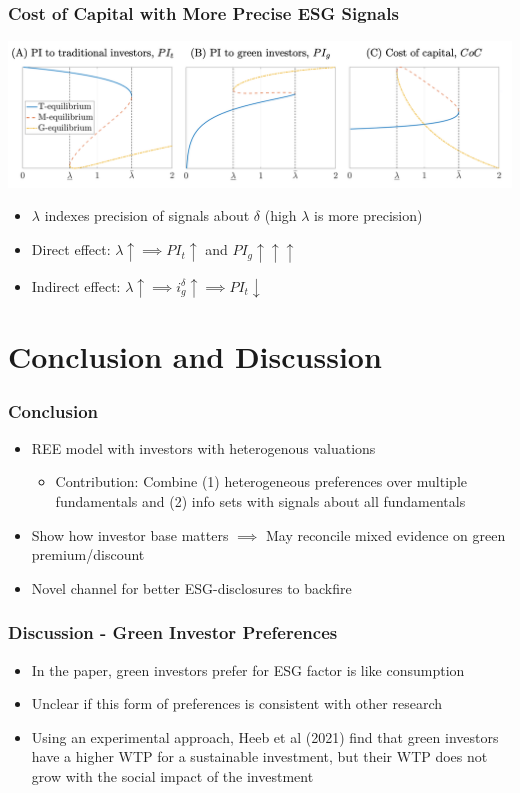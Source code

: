 \documentclass[handout]{beamer}
\begin{document}
\begin{frame}
\frametitle{Cost of Capital with More Precise ESG Signals}
\begin{center}
\includegraphics[scale=0.45]{information}
\end{center}
\begin{itemize}[<+->]
\item $\lambda$ indexes precision of signals about $\delta$ (high $\lambda$ is more precision)
\item Direct effect: $\lambda \uparrow \implies PI_t \uparrow$ and $PI_g \uparrow\uparrow\uparrow$
\item Indirect effect: $\lambda \uparrow \implies i_g^\delta \uparrow \implies PI_t \downarrow$
\end{itemize}
\end{frame}

\section{Conclusion and Discussion}

\begin{frame}
\frametitle{Conclusion}
\begin{itemize}[<+->]
\item REE model with investors with heterogenous valuations
\begin{itemize}[<+->]
\item Contribution: Combine (1) heterogeneous preferences over multiple fundamentals and (2) info sets with signals about all fundamentals
\end{itemize}
\bigskip
\item Show how investor base matters $\implies$ May reconcile mixed evidence on green premium/discount
\bigskip
\item Novel channel for better ESG-disclosures to backfire
\end{itemize}
\end{frame}


\begin{frame}
\frametitle{Discussion - Green Investor Preferences}
\begin{itemize}[<+->]
\item In the paper, green investors prefer for ESG factor is like consumption
\bigskip
\item Unclear if this form of preferences is consistent with other research
\bigskip
\item Using an experimental approach, Heeb et al (2021) find that green investors have a higher WTP for a sustainable investment, but their WTP does not grow with the social impact of the investment
\end{itemize}
\end{frame}
\end{document}
